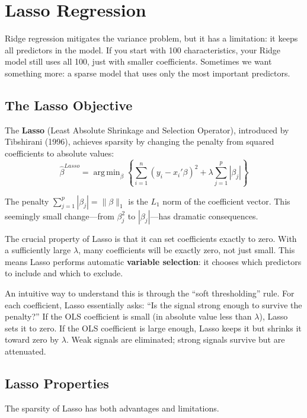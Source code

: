 \documentclass[11pt,a4paper]{article}
\DeclareMathOperator*{\argmin}{arg\,min}
\newcommand{\keyword}[1]{\textbf{\textcolor{AccentOrange}{#1}}}
\begin{document}
\section{Lasso Regression}

Ridge regression mitigates the variance problem, but it has a limitation: it keeps all predictors in the model. If you start with 100 characteristics, your Ridge model still uses all 100, just with smaller coefficients. Sometimes we want something more: a sparse model that uses only the most important predictors.

\subsection{The Lasso Objective}

The \keyword{Lasso} (Least Absolute Shrinkage and Selection Operator), introduced by Tibshirani (1996), achieves sparsity by changing the penalty from squared coefficients to absolute values:
\[
\widehat{\beta}^{Lasso} = \argmin_\beta \left\{ \sum_{i=1}^n (y_i - x_i'\beta)^2 + \lambda \sum_{j=1}^p |\beta_j| \right\}
\]

The penalty $\sum_{j=1}^p |\beta_j| = \|\beta\|_1$ is the $L_1$ norm of the coefficient vector. This seemingly small change---from $\beta_j^2$ to $|\beta_j|$---has dramatic consequences.

The crucial property of Lasso is that it can set coefficients exactly to zero. With a sufficiently large $\lambda$, many coefficients will be exactly zero, not just small. This means Lasso performs automatic \keyword{variable selection}: it chooses which predictors to include and which to exclude.

An intuitive way to understand this is through the ``soft thresholding'' rule. For each coefficient, Lasso essentially asks: ``Is the signal strong enough to survive the penalty?'' If the OLS coefficient is small (in absolute value less than $\lambda$), Lasso sets it to zero. If the OLS coefficient is large enough, Lasso keeps it but shrinks it toward zero by $\lambda$. Weak signals are eliminated; strong signals survive but are attenuated.

\subsection{Lasso Properties}

The sparsity of Lasso has both advantages and limitations.
\end{document}
